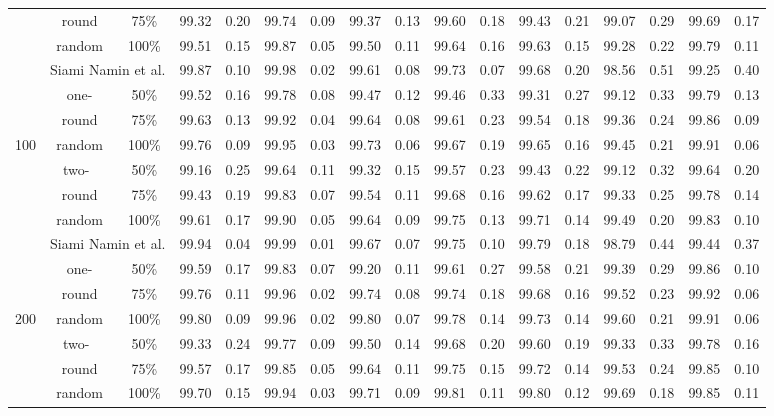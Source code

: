 \begin{table*}[t]
\begin{tabular}{|c||c|c||c|c||c|c||c|c||c|c||c|c||c|c||c|c|}
  \cline{3-17}
  ~&round&75\%&99.32&0.20&99.74&0.09&99.37&0.13&99.60&0.18&99.43&0.21&99.07&0.29&99.69&0.17\\
  \cline{3-17}
  ~&random&100\%&99.51&0.15&99.87&0.05&99.50&0.11&99.64&0.16&99.63&0.15&99.28&0.22&99.79&0.11\\
  \hline
  \hline
  ~&\multicolumn{2}{|c||}{Siami Namin et al.}&99.87&0.10&99.98&0.02&99.61&0.08&99.73&0.07&99.68&0.20&98.56&0.51&99.25&0.40\\
  \cline{2-17}
  ~&one-&50\%&99.52&0.16&99.78&0.08&99.47&0.12&99.46&0.33&99.31&0.27&99.12&0.33&99.79&0.13\\
  \cline{3-17}
  ~&round&75\%&99.63&0.13&99.92&0.04&99.64&0.08&99.61&0.23&99.54&0.18&99.36&0.24&99.86&0.09\\
  \cline{3-17}
  100&random&100\%&99.76&0.09&99.95&0.03&99.73&0.06&99.67&0.19&99.65&0.16&99.45&0.21&99.91&0.06\\
  \cline{2-17}
  ~&two-~&50\%&99.16&0.25&99.64&0.11&99.32&0.15&99.57&0.23&99.43&0.22&99.12&0.32&99.64&0.20\\
  \cline{3-17}
  ~&round&75\%&99.43&0.19&99.83&0.07&99.54&0.11&99.68&0.16&99.62&0.17&99.33&0.25&99.78&0.14\\
  \cline{3-17}
  ~&random&100\%&99.61&0.17&99.90&0.05&99.64&0.09&99.75&0.13&99.71&0.14&99.49&0.20&99.83&0.10\\
  \hline
  \hline
  ~&\multicolumn{2}{|c||}{Siami Namin et al.}&99.94&0.04&99.99&0.01&99.67&0.07&99.75&0.10&99.79&0.18&98.79&0.44&99.44&0.37\\
  \cline{2-17}
  ~&one-&50\%&99.59&0.17&99.83&0.07&99.20&0.11&99.61&0.27&99.58&0.21&99.39&0.29&99.86&0.10\\
  \cline{3-17}
  ~&round&75\%&99.76&0.11&99.96&0.02&99.74&0.08&99.74&0.18&99.68&0.16&99.52&0.23&99.92&0.06\\
  \cline{3-17}
  200&random&100\%&99.80&0.09&99.96&0.02&99.80&0.07&99.78&0.14&99.73&0.14&99.60&0.21&99.91&0.06\\
  \cline{2-17}
  ~&two-~&50\%&99.33&0.24&99.77&0.09&99.50&0.14&99.68&0.20&99.60&0.19&99.33&0.33&99.78&0.16\\
  \cline{3-17}
  ~&round&75\%&99.57&0.17&99.85&0.05&99.64&0.11&99.75&0.15&99.72&0.14&99.53&0.24&99.85&0.10\\
  \cline{3-17}
  ~&random&100\%&99.70&0.15&99.94&0.03&99.71&0.09&99.81&0.11&99.80&0.12&99.69&0.18&99.85&0.11\\
  \hline
\end{tabular}
\vspace{-4ex}
\end{table*}


